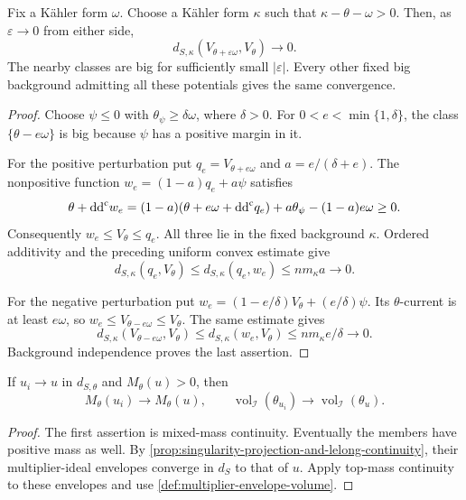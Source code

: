 \begin{proposition}\label{prop:minimal-potentials-nearby-backgrounds}
Fix a K\"ahler form $\omega$. Choose a K\"ahler form $\kappa$ such that $\kappa-\theta-\omega>0$. Then, as $\varepsilon\to0$ from either side,
\[
 d_{S,\kappa}(V_{\theta+\varepsilon\omega},V_\theta)\longrightarrow0.
\]
The nearby classes are big for sufficiently small $|\varepsilon|$. Every other fixed big background admitting all these potentials gives the same convergence.
\end{proposition}
\begin{proof}
Choose $\psi\leq0$ with $\theta_\psi\geq\delta\omega$, where $\delta>0$. For $0<e<\min\{1,\delta\}$, the class $\{\theta-e\omega\}$ is big because $\psi$ has a positive margin in it.

For the positive perturbation put $q_e=V_{\theta+e\omega}$ and $a=e/(\delta+e)$. The nonpositive function
$w_e=(1-a)q_e+a\psi$ satisfies
\[
 \theta+\mathrm{dd}^{\mathrm{c}} w_e
   =(1-a)(\theta+e\omega+\mathrm{dd}^{\mathrm{c}} q_e)
       +a\theta_\psi-(1-a)e\omega\geq0.
\]
Consequently $w_e\leq V_\theta\leq q_e$. All three lie in the fixed background $\kappa$. Ordered additivity and the preceding uniform convex estimate give
\[
 d_{S,\kappa}(q_e,V_\theta)
       \leq d_{S,\kappa}(q_e,w_e)\leq nm_\kappa a\longrightarrow0.
\]

For the negative perturbation put
$w_e=(1-e/\delta)V_\theta+(e/\delta)\psi$.
Its $\theta$-current is at least $e\omega$, so
$w_e\leq V_{\theta-e\omega}\leq V_\theta$. The same estimate gives
\[
 d_{S,\kappa}(V_{\theta-e\omega},V_\theta)
       \leq d_{S,\kappa}(w_e,V_\theta)
       \leq nm_\kappa e/\delta\longrightarrow0.
\]
Background independence proves the last assertion.
\end{proof}

\begin{corollary}\label{cor:positive-mass-multiplier-volume-continuity}
If $u_i\to u$ in $d_{S,\theta}$ and $M_\theta(u)>0$, then
\[
 M_\theta(u_i)\longrightarrow M_\theta(u),\qquad
 \operatorname{vol}_{\mathcal I}(\theta_{u_i})
                \longrightarrow\operatorname{vol}_{\mathcal I}(\theta_u).
\]
\end{corollary}
\begin{proof}
The first assertion is mixed-mass continuity. Eventually the members have positive mass as well. By \cref{prop:singularity-projection-and-lelong-continuity}, their multiplier-ideal envelopes converge in $d_S$ to that of $u$. Apply top-mass continuity to these envelopes and use \cref{def:multiplier-envelope-volume}.
\end{proof}

